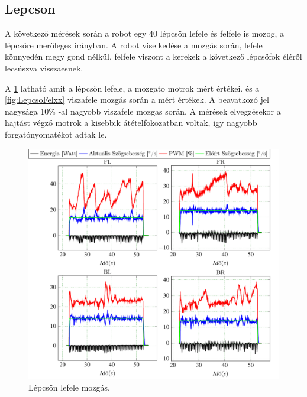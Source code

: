 \subsection{Lepcson}




\renewcommand{\GlobalPath}{Meresek/Mozgasok/Lepcso}
\renewcommand{\secondImage}{*} 

%

%


A következő mérések során a robot egy 40 \degree lépcsőn lefele és felfele is mozog, a lépcsőre merőleges irányban. A robot viselkedése a mozgás során, lefele könnyedén megy gond nélkül, felfele viszont a kerekek a következő lépcsőfok éléről lecsúszva visszaesnek.

A \ref{fig:LepcsoLexx} latható amit a lépcsőn lefele, a mozgato motrok mért értékei. és a \ref{fig:LepcsoFelxx} viszafele mozgás során a mért értékek. A beavatkozó jel nagysága 10\% -al  nagyobb viszafele mozgas során. A mérések elvegzésekor a hajtást végző motrok a kisebbik átételfokozatban voltak, igy nagyobb forgatónyomatékot adtak le.

\begin{figure}[H]
  \includegraphics{tikz/LepcsoLexx.pdf}
  \caption{Lépcsőn lefele mozgás.}
  \label{fig:LepcsoLexx}
\end{figure}

